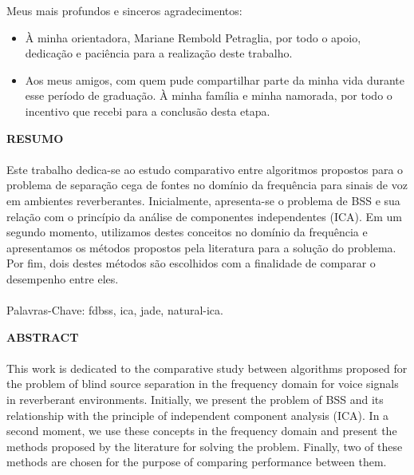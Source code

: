 Meus mais profundos e sinceros agradecimentos:
\begin{itemize}
    \item À minha orientadora, Mariane Rembold Petraglia, por todo o apoio, dedicação e paciência para a realização deste trabalho. 
    \item Aos meus amigos, com quem pude compartilhar parte da minha vida durante esse período de graduação.
    À minha família e minha namorada, por todo o incentivo que recebi para a conclusão desta etapa.
\end{itemize}

\pagebreak


\begin{center}
\textbf{RESUMO}
\end{center}
      \vspace{0.5cm}

\paragraph{}
Este trabalho dedica-se ao estudo comparativo entre algoritmos propostos para o problema de separação cega de fontes no domínio da frequência para sinais de voz em ambientes reverberantes. Inicialmente, apresenta-se o problema de BSS e sua relação com o princípio da análise de componentes independentes (ICA). Em um segundo momento, utilizamos destes conceitos no domínio da frequência e apresentamos os métodos propostos pela literatura para a solução do problema. Por fim, dois destes métodos são escolhidos com a finalidade de comparar o desempenho entre eles.

\paragraph{}
\noindent Palavras-Chave: fdbss, ica, jade, natural-ica.

\pagebreak


\begin{center}
\textbf{ABSTRACT}
\end{center}
      \vspace{0.5cm}

\paragraph{}

This work is dedicated to the comparative study between algorithms proposed for the problem of blind source separation in the frequency domain for voice signals in reverberant environments. Initially, we present the problem of BSS and its relationship with the principle of independent component analysis (ICA). In a second moment, we use these concepts in the frequency domain and present the methods proposed by the literature for solving the problem. Finally, two of these methods are chosen for the purpose of comparing performance between them.

